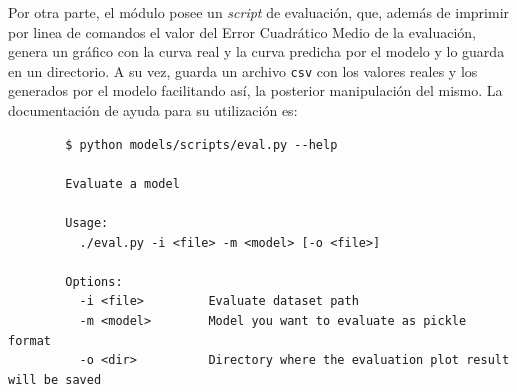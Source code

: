         \par Por otra parte, el módulo posee un \textit{script} de evaluación,
        que, además de imprimir por linea de comandos el valor del Error Cuadrático Medio de la
        evaluación, genera un gráfico con la curva real y la curva predicha
        por el modelo y lo guarda en un directorio. A su vez, guarda un
        archivo \verb|csv| con los valores reales y los generados por el modelo
        facilitando así, la posterior manipulación del mismo.
        La documentación de ayuda para su utilización es:
        \begin{lstlisting}
        $ python models/scripts/eval.py --help

        Evaluate a model

        Usage:
          ./eval.py -i <file> -m <model> [-o <file>]

        Options:
          -i <file>         Evaluate dataset path
          -m <model>        Model you want to evaluate as pickle format
          -o <dir>          Directory where the evaluation plot result will be saved

        \end{lstlisting}


